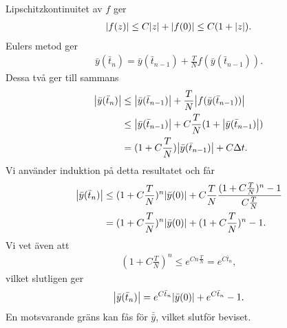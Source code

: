 Lipschitzkontinuitet av $f$ ger
\begin{align*}
	\abs{f(z)} \leq C\abs{z} + \abs{f(0)} \leq C(1 + \abs{z}).
\end{align*}
Eulers metod ger
\begin{align*}
	\bar{y}(\bar{t}_{n}) = \bar{y}(\bar{t}_{n - 1}) + \frac{T}{N}f(\bar{y}(\bar{t}_{n - 1})).
\end{align*}
Dessa två ger till sammans
\begin{align*}
	\abs{\bar{y}(\bar{t}_{n})} &\leq \abs{\bar{y}(\bar{t}_{n - 1})} + \frac{T}{N}\abs{f(\bar{y}(\bar{t}_{n - 1}))} \\
	                           &\leq \abs{\bar{y}(\bar{t}_{n - 1})} + C\frac{T}{N}(1 + \abs{\bar{y}(\bar{t}_{n - 1})}) \\
	                           &= (1 + C\frac{T}{N})\abs{\bar{y}(\bar{t}_{n - 1})} + C\Delta t.
\end{align*}
Vi använder induktion på detta resultatet och får
\begin{align*}
	\abs{\bar{y}(\bar{t}_{n})} &\leq (1 + C\frac{T}{N})^{n}\abs{\bar{y}(0)} + C\frac{T}{N}\frac{(1 + C\frac{T}{N})^{n} - 1}{C\frac{T}{N}} \\
	                           &= (1 + C\frac{T}{N})^{n}\abs{\bar{y}(0)} + (1 + C\frac{T}{N})^{n} - 1.
\end{align*}
Vi vet även att
\begin{align*}
	(1 + C\frac{T}{N})^{n} \leq e^{Cn\frac{T}{N}} = e^{C\bar{t}_{n}},
\end{align*}
vilket slutligen ger
\begin{align*}
	\abs{\bar{y}(\bar{t}_{n})} = e^{C\bar{t}_{n}}\abs{\bar{y}(0)} + e^{C\bar{t}_{n}} - 1.
\end{align*}
En motsvarande gräns kan fås för $\bar{\bar{y}}$, vilket slutför beviset.

